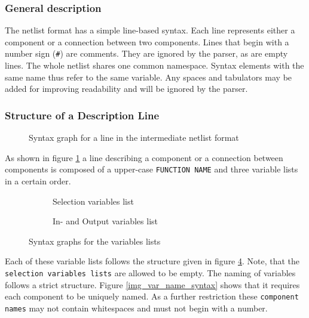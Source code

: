 
\subsubsection{General description}
The netlist format has a simple line-based syntax.
Each line represents either a component or a connection between two components.
Lines that begin with a number sign (\texttt{\#}) are comments.
They are ignored by the parser, as are empty lines.
The whole netlist shares one common namespace.
Syntax elements with the same name thus refer to the same variable.
Any spaces and tabulators may be added for improving readability and will be ignored by the parser.

\subsubsection{Structure of a Description Line}
\label{sec_netlist_syntax}
\begin{figure}[Hbt]
	
	\caption{Syntax graph for a line in the intermediate netlist format}
		\label{img_line_syntax}
\end{figure}

As shown in figure \ref{img_line_syntax} a line describing a component or a connection between components is composed of a upper-case \texttt{FUNCTION NAME} and three variable lists in a certain order.

\begin{figure}[Hbt]
        \centering
        \begin{subfigure}[b]{0.4\textwidth}
               
                \caption{Selection variables list}
                \label{img_var_syntax_mayempty}
        \end{subfigure}%
        \hfill %
        \begin{subfigure}[b]{0.4\textwidth}
                
                \caption{In- and Output variables list}
                \label{img_var_syntax_nonempty}
        \end{subfigure}
        \caption{Syntax graphs for the variables lists}
        \label{img_var_syntax}
\end{figure}

Each of these variable lists follows the structure given in figure \ref{img_var_syntax}.
Note, that the \texttt{selection variables lists} are allowed to be empty.
The naming of variables follows a strict structure.
Figure \ref{img_var_name_syntax} shows that it requires each component to be uniquely named. As a further restriction these \texttt{component names} may not contain whitespaces and must not begin with a number.

